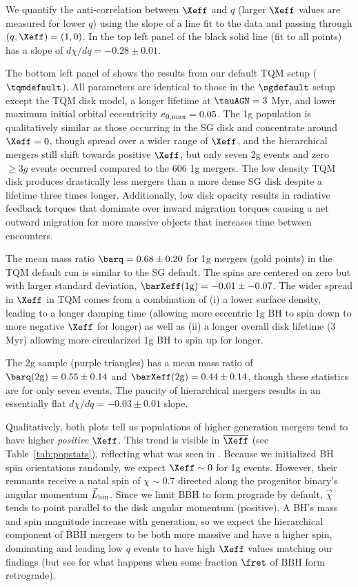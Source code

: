 We quantify the anti-correlation between $\Xeff$ and $q$ (larger $\Xeff$ values are measured for lower $q$) using the slope of a line fit to the data and passing through $(q,\Xeff)=(1,0)$.
In the top left panel of  the black solid line (fit to all points) has a slope of $d\chi/dq=-0.28\pm0.01$.

The bottom left panel of  shows the results from our default TQM setup ($\tqmdefault$).
All parameters are identical to those in the $\sgdefault$ setup except the TQM disk model, a longer lifetime at $\tauAGN=3$ Myr, and lower maximum initial orbital eccentricity $e_{\rm 0,max}=0.05$.
The 1g population is qualitatively similar as those occurring in the SG disk and concentrate around $\Xeff=0$, though spread over a wider range of $\Xeff$, and the hierarchical mergers still shift towards positive $\Xeff$, but only seven 2g events and zero $\geq3g$ events occurred compared to the 606 1g mergers.
The low density TQM disk produces drastically less mergers than a more dense SG disk despite a lifetime three times longer.
Additionally, low disk opacity results in radiative feedback torques that dominate over inward migration torques causing a net outward migration for more massive objects that increases time between encounters.

The mean mass ratio $\barq=0.68\pm0.20$ for 1g mergers (gold points) in the TQM default run is similar to the SG default.
The spins are centered on zero but with larger standard deviation, $\barXeff({\rm 1g})=-0.01\pm-0.07$.
The wider spread in $\Xeff$ in TQM comes from a combination of (i) a lower surface density, leading to a longer damping time (allowing more eccentric 1g BH to spin down to more negative $\Xeff$ for longer) as well as (ii) a longer overall disk lifetime (3 Myr) allowing more circularized 1g BH to spin up for longer.


The 2g sample (purple triangles) has a mean mass ratio of $\barq({\rm 2g})=0.55\pm0.14$ and $\barXeff({\rm 2g})=0.44\pm0.14$, though these statistics are for only seven events.
The paucity of hierarchical mergers results in an essentially flat $d\chi/dq=-0.03\pm0.01$ slope.

Qualitatively, both plots tell us populations of higher generation mergers tend to have higher \textit{positive} $\Xeff$.
This trend is visible in $\overline{\Xeff}$ (see Table~\ref{tab:popstats}), reflecting what was seen in \citet{Mckernan+22:q-Xeff}.
Because we initialized BH spin orientations randomly, we expect $\Xeff\sim0$ for 1g events.
However, their remnants receive a natal spin of $\chi \sim 0.7$ directed along the progenitor binary's angular momentum $\vec{L}_{\rm bin}$.
Since we limit BBH to form prograde by default, $\vec{\chi}$ tends to point parallel to the disk angular momentum (positive).
A BH's mass and spin magnitude increase with generation, so we expect the hierarchical component of BBH mergers to be both more massive and have a higher spin, dominating  and leading low $q$ events to have high $\Xeff$ values matching our findings (but see  for what happens when some fraction $\fret$ of BBH form retrograde).

